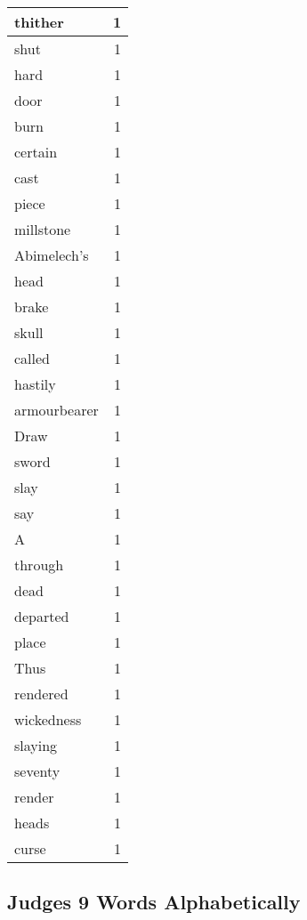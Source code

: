 \begin{center}
\begin{longtable}{l|r}
thither & 1\\ \hline 
shut & 1\\ \hline 
hard & 1\\ \hline 
door & 1\\ \hline 
burn & 1\\ \hline 
certain & 1\\ \hline 
cast & 1\\ \hline 
piece & 1\\ \hline 
millstone & 1\\ \hline 
Abimelech's & 1\\ \hline 
head & 1\\ \hline 
brake & 1\\ \hline 
skull & 1\\ \hline 
called & 1\\ \hline 
hastily & 1\\ \hline 
armourbearer & 1\\ \hline 
Draw & 1\\ \hline 
sword & 1\\ \hline 
slay & 1\\ \hline 
say & 1\\ \hline 
A & 1\\ \hline 
through & 1\\ \hline 
dead & 1\\ \hline 
departed & 1\\ \hline 
place & 1\\ \hline 
Thus & 1\\ \hline 
rendered & 1\\ \hline 
wickedness & 1\\ \hline 
slaying & 1\\ \hline 
seventy & 1\\ \hline 
render & 1\\ \hline 
heads & 1\\ \hline 
curse & 1\\ \hline 
\end{longtable}
\end{center}





\subsection{Judges 9 Words Alphabetically}


\normalsize
 
